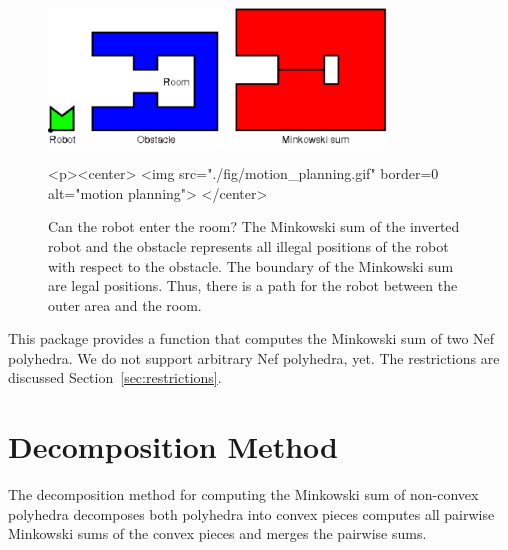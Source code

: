 \begin{figure}
  \begin{ccTexOnly}
    \begin{center}
      \includegraphics[width=0.8\textwidth]{Minkowski_sum_3/fig/motion_planning}
    \end{center}
  \end{ccTexOnly}
  \begin{ccHtmlOnly}
    <p><center>
    <img src="./fig/motion_planning.gif" border=0 alt="motion planning">
    </center>
  \end{ccHtmlOnly}
  \caption{Can the robot enter the room? The Minkowski sum of the inverted
           robot and the obstacle represents all illegal positions of the 
           robot with respect to the obstacle. 
           The boundary of the Minkowski sum are legal positions. Thus, there
           is a path for the robot between the outer area and the room.}
  \label{fig:motionPlanning}
\end{figure}

This package provides a function  that computes
the Minkowski sum of two Nef polyhedra. We do not support arbitrary
Nef polyhedra, yet. The restrictions are discussed
Section~\ref{sec:restrictions}.

\section{Decomposition Method}

The decomposition method for computing the Minkowski sum of non-convex
polyhedra decomposes both polyhedra into convex pieces computes all
pairwise Minkowski sums of the convex pieces and merges the pairwise
sums.

